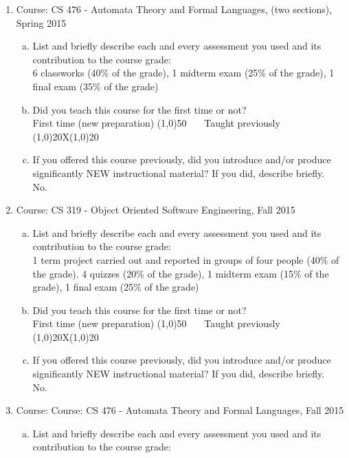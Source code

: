\begin{enumerate}
  \item Course: CS 476 - Automata Theory and Formal Languages, (two sections), Spring 2015
    \begin{enumerate}[a)]
    \item  List and briefly describe each and every assessment you used and its contribution to the course grade:\\
      6 classworks (40\% of the grade),  1 midterm exam (25\% of the grade), 1 final exam (35\% of the grade) 	 
    \item Did you teach this course for the first time or not? \\
      First time (new preparation) \line(1,0){50}  ~~~Taught previously \line(1,0){20}X\line(1,0){20}
    \item If you offered this course previously, did you introduce and/or produce significantly NEW instructional material? If you did, describe briefly. \\
      No. 
    \end{enumerate}
  \item Course: CS 319 - Object Oriented Software Engineering, Fall 2015
    \begin{enumerate}[a)]
    \item  List and briefly describe each and every assessment you used and its contribution to the course grade:\\
      1 term project carried out and reported in groups of four people (40\% of the grade).  4 quizzes (20\% of the grade), 1 midterm exam (15\% of the grade), 1 final exam (25\% of the grade) 
    \item Did you teach this course for the first time or not? \\
      First time (new preparation) \line(1,0){50}  ~~~Taught previously \line(1,0){20}X\line(1,0){20}
    \item If you offered this course previously, did you introduce and/or produce significantly NEW instructional material? If you did, describe briefly. \\
      No.
    \end{enumerate}
  \item Course: Course: CS 476 - Automata Theory and Formal Languages, Fall 2015
    \begin{enumerate}[a)]
    \item  List and briefly describe each and every assessment you used and its contribution to the course grade:\\

\end{enumerate}
\end{enumerate}
